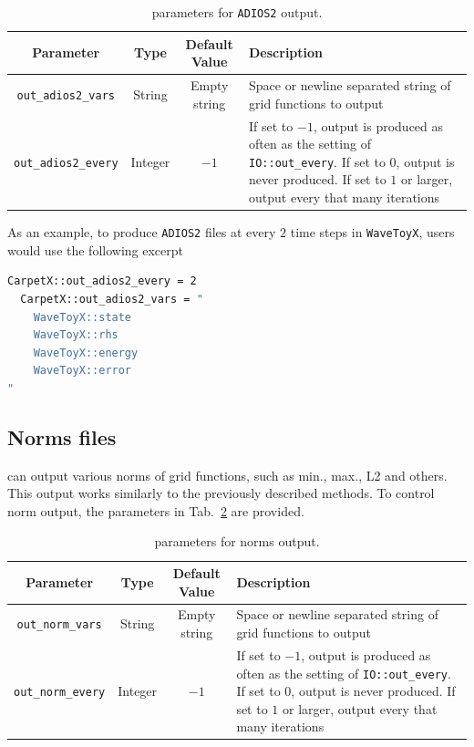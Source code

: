 \begin{table}[ht]
  \centering
  \begin{tabularx}{\textwidth}{cccX}
    Parameter                 & Type    & Default Value  & Description \\\hline\hline
    \texttt{out\_adios2\_vars}  & String  & Empty string   & Space or newline separated string of grid functions to output \\
    \texttt{out\_adios2\_every} & Integer & $-1$           & If set to $-1$, output is produced as often as the setting of \texttt{IO::out\_every}. If set to $0$, output is never produced. If set to $1$ or larger, output every that many iterations \\\hline\hline
  \end{tabularx}
  \label{tab:adios2_params}
  \caption{\CarpetX\space parameters for \texttt{ADIOS2} output.}
\end{table}

As an example, to produce \texttt{ADIOS2} files at every $2$ time steps in \texttt{WaveToyX}, users would use the following excerpt

\begin{lstlisting}[language=bash]
  CarpetX::out_adios2_every = 2
  CarpetX::out_adios2_vars = "
    WaveToyX::state
    WaveToyX::rhs
    WaveToyX::energy
    WaveToyX::error
"
\end{lstlisting}

\subsection{Norms files}

\CarpetX can output various norms of grid functions, such as min., max., L2 and others. This output works similarly to the previously described methods. To control norm output, the parameters in Tab.~\ref{tab:norms_output} are provided.

\begin{table}[hb]
  \centering
  \begin{tabularx}{\textwidth}{cccX}
    Parameter                 & Type    & Default Value  & Description \\\hline\hline
    \texttt{out\_norm\_vars}  & String  & Empty string   & Space or newline separated string of grid functions to output \\
    \texttt{out\_norm\_every} & Integer & $-1$           & If set to $-1$, output is produced as often as the setting of \texttt{IO::out\_every}. If set to $0$, output is never produced. If set to $1$ or larger, output every that many iterations \\\hline\hline
  \end{tabularx}
  \label{tab:norms_output}
  \caption{\CarpetX\space parameters for norms output.}
\end{table}


